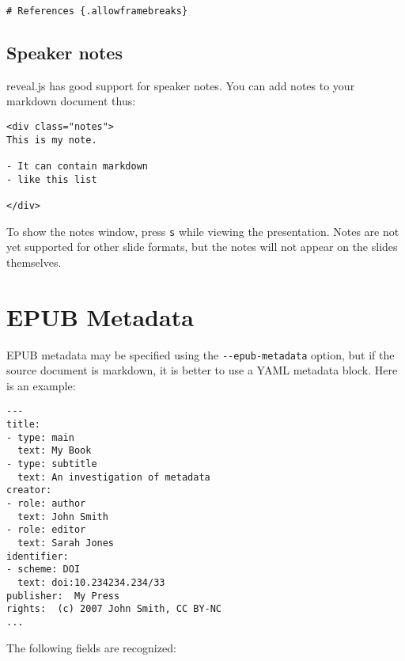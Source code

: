 \documentclass[]{article}
\begin{document}
\begin{verbatim}
# References {.allowframebreaks}
\end{verbatim}

\subsection{Speaker notes}

reveal.js has good support for speaker notes. You can add notes to your
markdown document thus:

\begin{verbatim}
<div class="notes">
This is my note.

- It can contain markdown
- like this list

</div>
\end{verbatim}

To show the notes window, press \texttt{s} while viewing the
presentation. Notes are not yet supported for other slide formats, but
the notes will not appear on the slides themselves.

\section{EPUB Metadata}

EPUB metadata may be specified using the \texttt{-{}-epub-metadata}
option, but if the source document is markdown, it is better to use a
YAML metadata block. Here is an example:

\begin{verbatim}
---
title:
- type: main
  text: My Book
- type: subtitle
  text: An investigation of metadata
creator:
- role: author
  text: John Smith
- role: editor
  text: Sarah Jones
identifier:
- scheme: DOI
  text: doi:10.234234.234/33
publisher:  My Press
rights:  (c) 2007 John Smith, CC BY-NC
...
\end{verbatim}

The following fields are recognized:
\end{document}
